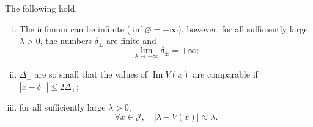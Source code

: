 \begin{Remark}
	\label{rem:delta}
The following hold.
\begin{enumerate}[i)]
\item 
The infimum can be infinite 
($\inf \varnothing = + \infty$), however, 
for all sufficiently large $\lambda>0$, 
the numbers $\delta_\pm$ are finite and 
\begin{equation}\label{delta.lim}
\lim_{\lambda\to + \infty} \delta_\pm = + \infty ;
\end{equation}
	\item $\Delta_\pm$ are so small that the values of ${\operatorname{Im}} V(x)$ are comparable if $|x - \delta_\pm| \leq 2\Delta_\pm$;
	\item for all sufficiently large  $\lambda>0$,
	\begin{equation}\label{lam.V.comp}
	\forall x \in {\mathcal J}, \quad |\lambda-V(x)| \approx \lambda.
	\end{equation}
\end{enumerate}
\end{Remark}

